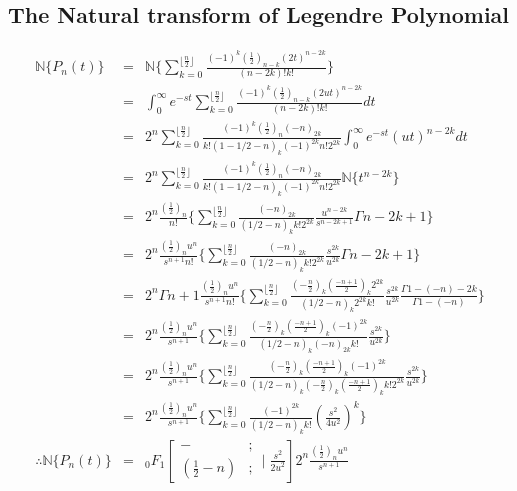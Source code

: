 \subsection{The Natural transform of Legendre Polynomial}
  \begin{eqnarray*}
  \mathbb{N}\lbrace P_{n}(t)\rbrace &=& \mathbb{N}\lbrace { \sum_{k=0}^{\lfloor\frac{n}{2}\rfloor} \frac{(-1)^{k}(\frac{1}{2})_{n-k}(2t)^{n-2k}}{(n-2k)!k!}}\rbrace\\
 &=&\int_{0}^{\infty} e^{-st} \sum_{k=0}^{\lfloor\frac{n}{2}\rfloor} \frac{(-1)^{k}(\frac{1}{2})_{n-k}(2ut)^{n-2k}}{(n-2k)!k!}dt\\
  &=&2^{n}\sum_{k=0}^{\lfloor\frac{n}{2}\rfloor} \frac{(-1)^{k}(\frac{1}{2})_{n}(-n)_{2k}}{k!(1-1/2-n)_{k}(-1)^{2k}n!2^{2k}}\int_{0}^{\infty} e^{-st}(ut)^{n-2k}dt\\
  &=&2^{n} \sum_{k=0}^{\lfloor\frac{n}{2}\rfloor} \frac{(-1)^{k}(\frac{1}{2})_{n}(-n)_{2k}}{k!(1-1/2-n)_{k}(-1)^{2k}n!2^{2k}}\mathbb{N} \lbrace t^{n-2k} \rbrace\\
  &=&2^{n}\frac{(\frac{1}{2})_{n}}{n!}\lbrace{  \sum_{k=0}^{\lfloor\frac{n}{2}\rfloor} \frac{(-n)_{2k}}{(1/2-n)_{k}k!2^{2k}} \frac{u^{n-2k}}{s^{n-2k+1}}\Gamma{n-2k+1}}\rbrace\\
   &=&2^{n}\frac{(\frac{1}{2})_{n}u^{n}}{s^{n+1}n!}\lbrace  \sum_{k=0}^{\lfloor\frac{n}{2}\rfloor} \frac{(-n)_{2k}}{(1/2-n)_{k}k!2^{2k}} \frac{s^{2k}}{u^{2k}}\Gamma{n-2k+1}\rbrace\\
  &=&2^{n}\Gamma{n+1}\frac{(\frac{1}{2})_{n}u^{n}}{s^{n+1}n!}\lbrace  \sum_{k=0}^{\lfloor\frac{n}{2}\rfloor} \frac{(-\frac{n}{2})_{k}(\frac{-n+1}{2})_{k}2^{2k}}{(1/2-n)_{k}2^{2k}k!} \frac{s^{2k}}{u^{2k}}\frac{\Gamma{1-(-n)-2k}}{\Gamma{1-(-n)}}\rbrace\\
  &=&2^{n}\frac{(\frac{1}{2})_{n}u^{n}}{s^{n+1}}\lbrace  \sum_{k=0}^{\lfloor\frac{n}{2}\rfloor} \frac{(-\frac{n}{2})_{k}(\frac{-n+1}{2})_{k}(-1)^{2k}}{(1/2-n)_{k}(-n)_{2k}k!} \frac{s^{2k}}{u^{2k}}\rbrace\\
  &=&2^{n}\frac{(\frac{1}{2})_{n}u^{n}}{s^{n+1}}\lbrace  \sum_{k=0}^{\lfloor\frac{n}{2}\rfloor} \frac{(-\frac{n}{2})_{k}(\frac{-n+1}{2})_{k}(-1)^{2k}}{(1/2-n)_{k}(-\frac{n}{2})_{k}(\frac{-n+1}{2})_{k}k!2^{2k}} \frac{s^{2k}}{u^{2k}}\rbrace\\
   &=&2^{n}\frac{(\frac{1}{2})_{n}u^{n}}{s^{n+1}}\lbrace  \sum_{k=0}^{\lfloor\frac{n}{2}\rfloor} \frac{(-1)^{2k}}{(1/2-n)_{k}k!}\left( \frac{s^2}{4u^2}\right) ^{k}\rbrace\\
  \therefore \mathbb{N}\lbrace P_{n}(t)\rbrace &=&{}_0 F_1\left[ \begin{array}{cc}
      -      &;\\
   (\frac{1}{2}-n) &; 
  \end{array}
 \mid{\frac{s^2}{{2u}^2}}
 \right]2^{n}\frac{(\frac{1}{2})_{n}u^{n}}{s^{n+1}} 
 \end{eqnarray*}
